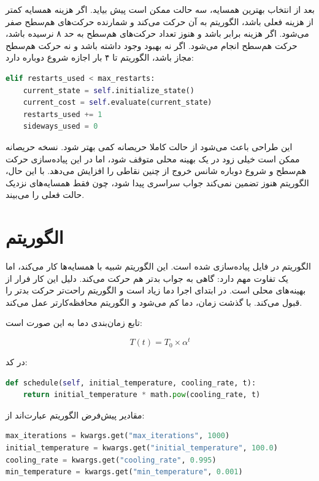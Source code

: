 \documentclass[10.5pt]{exam}
\begin{document}
بعد از انتخاب بهترین همسایه، سه حالت ممکن است پیش بیاید. اگر هزینه همسایه کمتر از هزینه فعلی باشد، الگوریتم به آن حرکت می‌کند و شمارنده حرکت‌های هم‌سطح صفر می‌شود. اگر هزینه برابر باشد و هنوز تعداد حرکت‌های هم‌سطح به حد ۸ نرسیده باشد، حرکت هم‌سطح انجام می‌شود. اگر نه بهبود وجود داشته باشد و نه حرکت هم‌سطح مجاز باشد، الگوریتم تا ۴ بار اجازه شروع دوباره دارد:

\begin{latin}
\begin{lstlisting}[language=Python]
elif restarts_used < max_restarts:
    current_state = self.initialize_state()
    current_cost = self.evaluate(current_state)
    restarts_used += 1
    sideways_used = 0
\end{lstlisting}
\end{latin}

این طراحی باعث می‌شود
از حالت کاملا حریصانه کمی بهتر شود. نسخه حریصانه ممکن است خیلی زود در یک بهینه محلی متوقف شود، اما در این پیاده‌سازی حرکت هم‌سطح و شروع دوباره شانس خروج از چنین نقاطی را افزایش می‌دهد. با این حال، الگوریتم هنوز تضمین نمی‌کند جواب سراسری پیدا شود، چون فقط همسایه‌های نزدیک حالت فعلی را می‌بیند.

\section{الگوریتم}
الگوریتم
در فایل
پیاده‌سازی شده است. این الگوریتم شبیه
با همسایه‌ها کار می‌کند، اما یک تفاوت مهم دارد: گاهی به جواب بدتر هم حرکت می‌کند. دلیل این کار فرار از بهینه‌های محلی است. در ابتدای اجرا دما زیاد است و الگوریتم راحت‌تر حرکت بدتر را قبول می‌کند. با گذشت زمان، دما کم می‌شود و الگوریتم محافظه‌کارتر عمل می‌کند.

تابع زمان‌بندی دما به این صورت است:

\[
    T(t) = T_0 \times \alpha^t
\]

در کد:

\begin{latin}
\begin{lstlisting}[language=Python]
def schedule(self, initial_temperature, cooling_rate, t):
    return initial_temperature * math.pow(cooling_rate, t)
\end{lstlisting}
\end{latin}

مقادیر پیش‌فرض الگوریتم عبارت‌اند از:

\begin{latin}
\begin{lstlisting}[language=Python]
max_iterations = kwargs.get("max_iterations", 1000)
initial_temperature = kwargs.get("initial_temperature", 100.0)
cooling_rate = kwargs.get("cooling_rate", 0.995)
min_temperature = kwargs.get("min_temperature", 0.001)
\end{lstlisting}
\end{latin}
\end{document}

